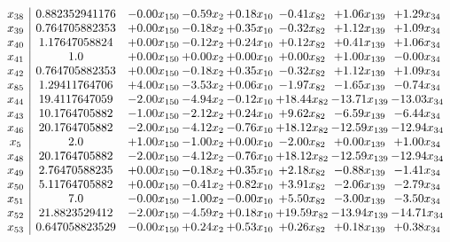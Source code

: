 \documentclass[8pt]{article}
\begin{document}
\[\begin{array}{c| c c@{\hskip 2pt} c@{\hskip 2pt} c@{\hskip 2pt} c@{\hskip 2pt} c@{\hskip 2pt} c@{\hskip 2pt} }
 x_{38}   &  0.882352941176 & -0.00 x_{150} & -0.59 x_{2} & +  0.18 x_{10} & -0.41 x_{82} & +  1.06 x_{139} & +  1.29 x_{34}\\
 x_{39}   &  0.764705882353 & +  0.00 x_{150} & -0.18 x_{2} & +  0.35 x_{10} & -0.32 x_{82} & +  1.12 x_{139} & +  1.09 x_{34}\\
 x_{40}   &  1.17647058824 & +  0.00 x_{150} & -0.12 x_{2} & +  0.24 x_{10} & +  0.12 x_{82} & +  0.41 x_{139} & +  1.06 x_{34}\\
 x_{41}   &  1.0 & +  0.00 x_{150} & +  0.00 x_{2} & +  0.00 x_{10} & +  0.00 x_{82} & +  1.00 x_{139} & -0.00 x_{34}\\
 x_{42}   &  0.764705882353 & +  0.00 x_{150} & -0.18 x_{2} & +  0.35 x_{10} & -0.32 x_{82} & +  1.12 x_{139} & +  1.09 x_{34}\\
 x_{85}   &  1.29411764706 & +  4.00 x_{150} & -3.53 x_{2} & +  0.06 x_{10} & -1.97 x_{82} & -1.65 x_{139} & -0.74 x_{34}\\
 x_{44}   &  19.4117647059 & -2.00 x_{150} & -4.94 x_{2} & -0.12 x_{10} & + 18.44 x_{82} & -13.71 x_{139} & -13.03 x_{34}\\
 x_{43}   &  10.1764705882 & -1.00 x_{150} & -2.12 x_{2} & +  0.24 x_{10} & +  9.62 x_{82} & -6.59 x_{139} & -6.44 x_{34}\\
 x_{46}   &  20.1764705882 & -2.00 x_{150} & -4.12 x_{2} & -0.76 x_{10} & + 18.12 x_{82} & -12.59 x_{139} & -12.94 x_{34}\\
 x_{5}   &  2.0 & +  1.00 x_{150} & -1.00 x_{2} & +  0.00 x_{10} & -2.00 x_{82} & +  0.00 x_{139} & +  1.00 x_{34}\\
 x_{48}   &  20.1764705882 & -2.00 x_{150} & -4.12 x_{2} & -0.76 x_{10} & + 18.12 x_{82} & -12.59 x_{139} & -12.94 x_{34}\\
 x_{49}   &  2.76470588235 & +  0.00 x_{150} & -0.18 x_{2} & +  0.35 x_{10} & +  2.18 x_{82} & -0.88 x_{139} & -1.41 x_{34}\\
 x_{50}   &  5.11764705882 & +  0.00 x_{150} & -0.41 x_{2} & +  0.82 x_{10} & +  3.91 x_{82} & -2.06 x_{139} & -2.79 x_{34}\\
 x_{51}   &  7.0 & -0.00 x_{150} & -1.00 x_{2} & -0.00 x_{10} & +  5.50 x_{82} & -3.00 x_{139} & -3.50 x_{34}\\
 x_{52}   &  21.8823529412 & -2.00 x_{150} & -4.59 x_{2} & +  0.18 x_{10} & + 19.59 x_{82} & -13.94 x_{139} & -14.71 x_{34}\\
 x_{53}   &  0.647058823529 & -0.00 x_{150} & +  0.24 x_{2} & +  0.53 x_{10} & +  0.26 x_{82} & +  0.18 x_{139} & +  0.38 x_{34}\\

\end{array}\]
\end{document}

